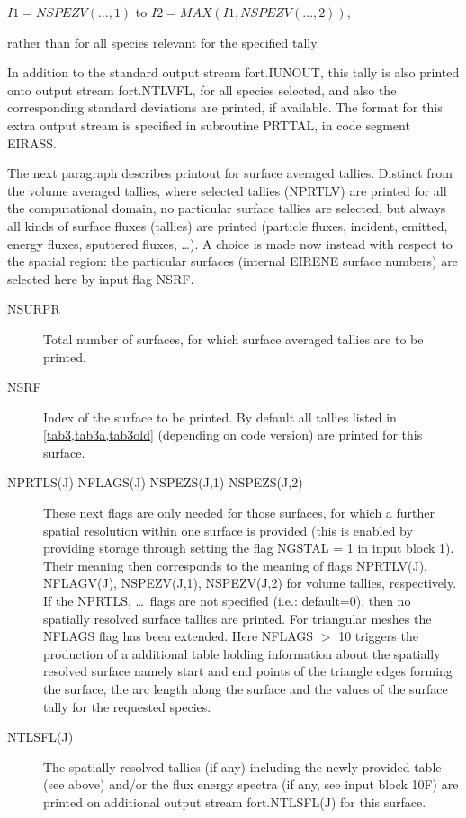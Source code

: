 \begin{description}
        $I1 = NSPEZV(\dots,1)$ to $I2 = MAX(I1,NSPEZV(\dots,2))$,

        rather than for all species relevant for the specified tally.
  \item[NTLVFL] In addition to the standard output stream fort.IUNOUT, this tally
        is also printed onto output stream fort.NTLVFL, for all species selected, and
        also the corresponding standard deviations are printed, if available.
        The format for this extra output stream is specified in subroutine PRTTAL, in
        code segment EIRASS.
\end{description}
The next paragraph describes printout for surface averaged tallies.
Distinct from the volume averaged tallies, where selected tallies (NPRTLV) are
printed for all the computational domain, no particular surface tallies are
selected, but always all kinds of surface fluxes (tallies) are printed
(particle fluxes, incident, emitted, energy fluxes, sputtered fluxes, \dots).
A choice is made now instead with respect to the spatial region:
the particular surfaces (internal EIRENE surface
numbers) are selected here by input flag NSRF.

\begin{description}
  \item[NSURPR] Total number of surfaces, for which surface averaged tallies are
        to be printed.
  \item[NSRF] Index of the surface to be printed.
        By default all tallies listed in \cref{tab3,tab3a,tab3old} (depending on code
        version) are printed for this surface.
  \item[NPRTLS(J) NFLAGS(J) NSPEZS(J,1) NSPEZS(J,2)] These next flags are only
        needed for those surfaces, for which a further spatial resolution within one
        surface is provided (this is enabled by providing storage through setting the
        flag NGSTAL = 1 in input block 1).
        Their meaning then corresponds to the meaning of flags NPRTLV(J), NFLAGV(J),
        NSPEZV(J,1), NSPEZV(J,2) for volume tallies, respectively.
        If the NPRTLS, \dots\ flags are not specified (i.e.: default=0), then no
        spatially resolved surface tallies are printed.
        For triangular meshes the NFLAGS flag has been extended. Here NFLAGS $>$ 10
        triggers the production of a additional table holding information about
        the spatially resolved surface namely start and end points of the triangle
        edges forming the surface, the arc length along the surface and the values
        of the surface tally for the requested species.
      \item[NTLSFL(J)] The spatially resolved tallies (if any) including the newly provided
        table (see above) and/or the flux energy spectra (if any, see input block 10F)
        are printed on additional output stream fort.NTLSFL(J) for this surface.
\end{description}

